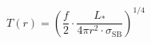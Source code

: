     \begin{equation}
    \boxed{
        T(r) = \left(
            \frac{f}{2}\cdot
            \frac{L_*}{4\pi r^2 \cdot \sigma_\text{SB}}
        \right)^{1/4}
    }
    \end{equation}

    

